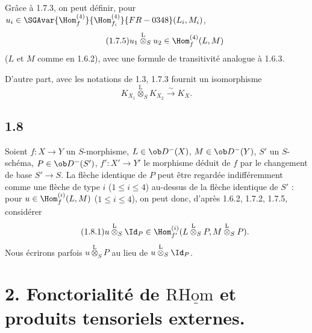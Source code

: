 Grâce à 1.7.3, on peut définir, pour $u_i\in\SGAvar{\Hom_f^{(4)}}{\Hom_{f_i}^{(4)}}{FR-0348}(L_i,M_i)$,
\begin{equation}\tag{1.7.5}
u_1\overset{\mathrm{L}}{\otimes}_{S}u_2\in\Hom_f^{(4)}(L,M)
\end{equation}
($L$ et $M$ comme en 1.6.2), avec une formule de transitivité analogue à 1.6.3.

D'autre part, avec les notations de 1.3, 1.7.3 fournit un isomorphisme
\begin{equation}\tag{1.7.6}
K_{X_1}\overset{\mathrm{L}}{\otimes}_{S}K_{X_2}\xrightarrow{\sim}K_X.
\end{equation}

\subsection*{1.8}
Soient $f:X\to Y$ un $S$-morphisme, $L\in\ob D^{-}(X)$, $M\in\ob D^{-}(Y)$, $S'$ un $S$-schéma, $P\in\ob D^{-}(S')$, $f':X'\to Y'$ le morphisme déduit de $f$ par le changement de base $S'\to S$. La flèche identique de $P$ peut être regardée indifféremment comme une flèche de type $i$ ($1\leq i\leq4$) au-dessus de la flèche identique de $S'$ : pour $u\in\Hom_f^{(i)}(L,M)$ ($1\leq i\leq4$), on peut donc, d'après 1.6.2, 1.7.2, 1.7.5, considérer
\begin{equation}\tag{1.8.1}
u\overset{\mathrm{L}}{\otimes}_{S}\Id_P\in\Hom_{f'}^{(i)}(L\overset{\mathrm{L}}{\otimes}_{S}P,M\overset{\mathrm{L}}{\otimes}_{S}P).
\end{equation}
Nous écrirons parfois $u\overset{\mathrm{L}}{\otimes}_{S}P$ au lieu de $u\overset{\mathrm{L}}{\otimes}_{S}\Id_P$.

\section*{2. Fonctorialité de \texorpdfstring{$\mathrm{R}\underline{\mathrm{Hom}}$}{RHom} et produits tensoriels externes.}

